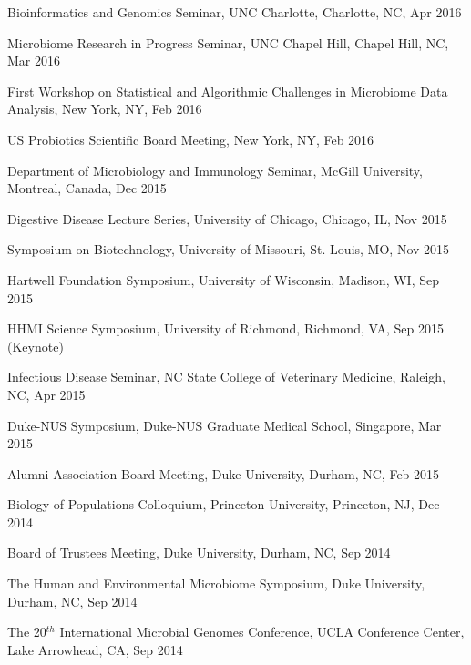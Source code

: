 \documentclass[overlapped,line,11pt]{res}
\begin{document}
\begin{resume}
\begin{revnumerate}[62]
\item {Bioinformatics and Genomics Seminar, UNC Charlotte, Charlotte, NC, Apr 2016}

\item {Microbiome Research in Progress Seminar, UNC Chapel Hill, Chapel Hill, NC, Mar 2016}

\item {First Workshop on Statistical and Algorithmic Challenges in Microbiome Data Analysis, New York, NY, Feb 2016}

\item {US Probiotics Scientific Board Meeting, New York, NY, Feb 2016}

\item {Department of Microbiology and Immunology Seminar, McGill University, Montreal, Canada, Dec 2015}

\item {Digestive Disease Lecture Series, University of Chicago, Chicago, IL, Nov 2015}

\item {Symposium on Biotechnology, University of Missouri, St. Louis, MO, Nov 2015}

\item {Hartwell Foundation Symposium, University of Wisconsin, Madison, WI, Sep 2015}

\item {HHMI Science Symposium, University of Richmond, Richmond, VA, Sep 2015 (Keynote)}

\item {Infectious Disease Seminar, NC State College of Veterinary Medicine, Raleigh, NC, Apr 2015}

\item {Duke-NUS Symposium, Duke-NUS Graduate Medical School, Singapore, Mar 2015}

\item {Alumni Association Board Meeting, Duke University,
  Durham, NC, Feb 2015
  }

\item {Biology of Populations Colloquium, Princeton University, Princeton, NJ, Dec 2014
  }

\item {Board of Trustees Meeting, Duke University,
  Durham, NC, Sep 2014
  }

\item { The Human and Environmental Microbiome Symposium, Duke University,
  Durham, NC, Sep 2014
  }

\item {The 20$^{th}$ International Microbial Genomes Conference, UCLA
  Conference Center, Lake Arrowhead, CA, Sep 2014
  }


\end{revnumerate}
\end{resume}
\end{document}
